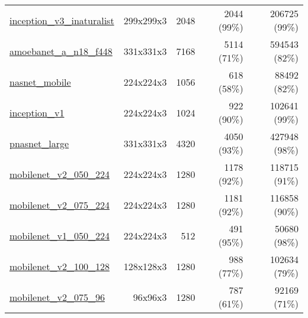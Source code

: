\begin{tabular}{lrrrr}
\href{https://tfhub.dev/google/inaturalist/inception\_v3/feature\_vector/1}{inception\_v3\_inaturalist} \cite{cui2018large}             &      299x299x3 &            2048 &           2044 (99\%) &   206725 (99\%)                       \\
\href{https://tfhub.dev/google/imagenet/amoebanet\_a\_n18\_f448/feature\_vector/1}{amoebanet\_a\_n18\_f448} \cite{real2018regularized}  &      331x331x3 &            7168 &           5114 (71\%) &   594543 (82\%)                       \\
\href{https://tfhub.dev/google/imagenet/nasnet\_mobile/feature\_vector/1}{nasnet\_mobile} \cite{zoph2018learning}                       &      224x224x3 &            1056 &            618 (58\%) &    88492 (82\%)                       \\
\href{https://tfhub.dev/google/imagenet/inception\_v1/feature\_vector/1}{inception\_v1} \cite{szegedy2015going}                         &      224x224x3 &            1024 &            922 (90\%) &   102641 (99\%)                       \\
\href{https://tfhub.dev/google/imagenet/pnasnet\_large/feature\_vector/2}{pnasnet\_large} \cite{liu2018progressive}                     &      331x331x3 &            4320 &           4050 (93\%) &   427948 (98\%)                       \\
\href{https://tfhub.dev/google/imagenet/mobilenet\_v2\_050\_224/feature\_vector/2}{mobilenet\_v2\_050\_224} \cite{howard2018inverted}   &      224x224x3 &            1280 &           1178 (92\%) &   118715 (91\%)                       \\
\href{https://tfhub.dev/google/imagenet/mobilenet\_v2\_075\_224/feature\_vector/2}{mobilenet\_v2\_075\_224} \cite{howard2018inverted}   &      224x224x3 &            1280 &           1181 (92\%) &   116858 (90\%)                       \\
\href{https://tfhub.dev/google/imagenet/mobilenet\_v1\_050\_224/feature\_vector/1}{mobilenet\_v1\_050\_224} \cite{howard2017mobilenets} &      224x224x3 &             512 &            491 (95\%) &    50680 (98\%)                       \\
\href{https://tfhub.dev/google/imagenet/mobilenet\_v2\_100\_128/feature\_vector/2}{mobilenet\_v2\_100\_128} \cite{howard2018inverted}   &      128x128x3 &            1280 &            988 (77\%) &   102634 (79\%)                       \\
\href{https://tfhub.dev/google/imagenet/mobilenet\_v2\_075\_96/feature\_vector/2}{mobilenet\_v2\_075\_96} \cite{howard2018inverted}     &        96x96x3 &            1280 &            787 (61\%) &    92169 (71\%)                       \\

\end{tabular}
